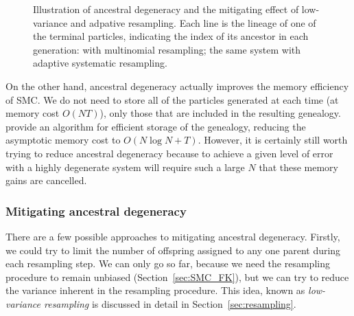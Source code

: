 \begin{figure}[ht]
\centering
{}
\caption[Ancestral degeneracy]{Illustration of ancestral degeneracy and the mitigating effect of low-variance and adpative resampling.
Each line is the lineage of one of the terminal particles, indicating the index of its ancestor in each generation:
 with multinomial resampling;
 the same system with adaptive systematic resampling.}
\label{fig:ancestral_degeneracy}
\end{figure}
On the other hand, ancestral degeneracy actually improves the memory efficiency of SMC. We do not need to store all of the particles generated at each time (at memory cost $O(NT)$), only those that are included in the resulting genealogy. \textcite{jacob2015} provide an algorithm for efficient storage of the genealogy, reducing the asymptotic memory cost to $O(N\log N+T)$.
However, it is certainly still worth trying to reduce ancestral degeneracy because to achieve a given level of error with a highly degenerate system will require such a large $N$ that these memory gains are cancelled.


\subsubsection{Mitigating ancestral degeneracy}
There are a few possible approaches to mitigating ancestral degeneracy.
Firstly, we could try to limit the number of offspring assigned to any one parent during each resampling step. We can only go so far, because we need the resampling procedure to remain unbiased (Section~\ref{sec:SMC_FK}), but we can try to reduce the variance inherent in the resampling procedure. This idea, known as \emph{low-variance resampling}\seb{[citation?]} is discussed in detail in Section~\ref{sec:resampling}.

